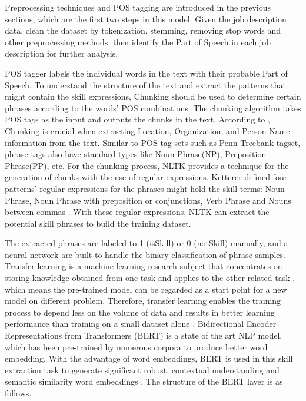 Preprocessing techniques and POS tagging are introduced in the previous sections, which are the first two steps in this model. Given the job description data, clean the dataset by tokenization, stemming, removing stop words and other preprocessing methods, then identify the Part of Speech in each job description for further analysis. 

POS tagger labels the individual words in the text with their probable Part of Speech. To understand the structure of the text and extract the patterns that might contain the skill expressions, Chunking should be used to determine certain phrases according to the words' POS combinations. The chunking algorithm takes POS tags as the input and outputs the chunks in the text. According to \cite{d'souza_2018}, Chunking is crucial when extracting Location, Organization, and Person Name information from the text. Similar to POS tag sets such as Penn Treebank tagset, phrase tags also have standard types like Noun Phrase(NP), Preposition Phrase(PP), etc. For the chunking process, NLTK provides a technique for the generation of chunks with the use of regular expressions. Ketterer defined four patterns' regular expressions for the phrases might hold the skill terms: Noun Phrase, Noun Phrase with preposition or conjunctions, Verb Phrase and Nouns between commas \cite{ketterer}. With these regular expressions, NLTK can extract the potential skill phrases to build the training dataset.

The extracted phrases are labeled to 1 (isSkill) or 0 (notSkill) manually, and a neural network are built to handle the binary classification of phrase samples. Transfer learning is a machine learning research subject that concentrates on storing knowledge obtained from one task and applies to the other related task \cite{enwiki:1099727359}, which means the pre-trained model can be regarded as a start point for a new model on different problem. Therefore, transfer learning enables the training process to depend less on the volume of data and results in better learning performance than training on a small dataset alone \cite{zhuang2020comprehensive}. Bidirectional Encoder Representations from Transformers (BERT) is a state of the art NLP model, which has been pre-trained by numerous corpora to produce better word embedding. With the advantage of word embeddings, BERT is used in this skill extraction task to generate significant robust, contextual understanding and semantic similarity word embeddings \cite{ketterer2}. The structure of the BERT layer is as follows.

